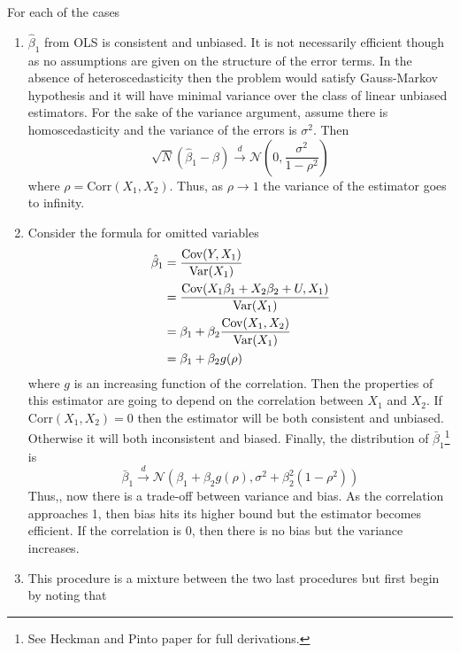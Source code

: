 \documentclass{article}
\begin{document}
\begin{solution}
For each of the cases
\begin{enumerate}[label=(\alph*)]
    \item $\hat\beta_1$ from OLS is consistent and unbiased. It is not necessarily efficient though as no assumptions are given on the structure of the error terms. In the absence of heteroscedasticity then the problem would satisfy Gauss-Markov hypothesis and it will have minimal variance over the class of linear unbiased estimators. For the sake of the variance argument, assume there is homoscedasticity and the variance of the errors is $\sigma^2$. Then \begin{equation*}
        \sqrt{N}\left(\hat{\beta}_1-\beta\right) \xrightarrow{d} \mathcal{N}\left(0,\frac{\sigma^2}{1-\rho^2}\right)
    \end{equation*}
    where $\rho = \text{Corr}(X_1,X_2)$. Thus, as $\rho\to1$ the variance of the estimator goes to infinity. 
    \item Consider the formula for omitted variables
    \begin{align*}
        \hat{\beta}_1 &= \frac{\text{Cov}(Y,X_1)}{\text{Var}(X_1)} \\ 
        &= \frac{\text{Cov}(X_1\beta_1+X_2\beta_2+U,X_1)}{\text{Var}(X_1)} \\ 
        &= \beta_1 + \beta_2\frac{\text{Cov}(X_1,X_2)}{\text{Var}(X_1)} \\ 
        &= \beta_1 + \beta_2g(\rho)
    \end{align*}
    where $g$ is an increasing function of the correlation. Then the properties of this estimator are going to depend on the correlation between $X_1$ and $X_2$. If $\text{Corr}(X_1,X_2)=0$ then the estimator will be both consistent and unbiased. Otherwise it will both inconsistent and biased. Finally, the distribution of $\bar{\beta}_1$\footnote{See Heckman and Pinto paper for full derivations. } is 
    \begin{equation*}
        \bar{\beta}_1 \xrightarrow{d}\mathcal{N}\left(\beta_1+\beta_2g(\rho),\sigma^2+\beta_2^2(1-\rho^2)\right)
    \end{equation*}
    Thus,, now there is a trade-off between variance and bias. As the correlation approaches 1, then bias hits its higher bound but the estimator becomes efficient. If the correlation is 0, then there is no bias but the variance increases. 
    \item This procedure is a mixture between the two last procedures but first begin by noting that 
    \begin{equation*}

\end{equation*}
\end{enumerate}
\end{solution}
\end{document}
